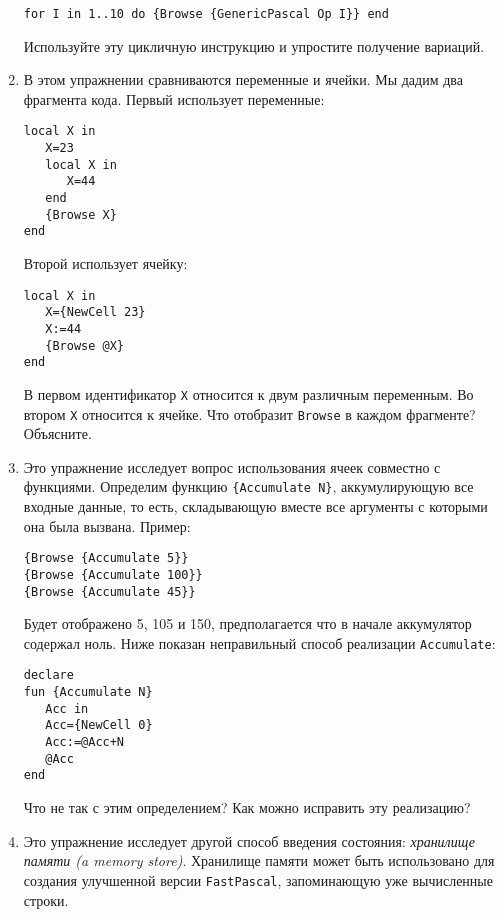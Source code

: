 \begin{enumerate}
{\begin{enumerate}
{\begin{lstlisting} 
for I in 1..10 do {Browse {GenericPascal Op I}} end
 \end{lstlisting}

Используйте эту цикличную инструкцию и упростите получение вариаций.}
\end{enumerate}


}

\item{
В этом упражнении сравниваются переменные и ячейки. Мы дадим два фрагмента кода. Первый использует переменные:

\begin{lstlisting}
local X in
   X=23
   local X in
      X=44
   end
   {Browse X}
end
\end{lstlisting}

Второй использует ячейку:

\begin{lstlisting}
local X in
   X={NewCell 23}
   X:=44
   {Browse @X}
end
\end{lstlisting}

В первом идентификатор \lstinline|X| относится к двум различным переменным. Во втором \lstinline|X| относится к ячейке. Что отобразит \lstinline|Browse| в каждом фрагменте? Объясните.
}

\item{Это упражнение исследует вопрос использования ячеек совместно с функциями. Определим функцию \lstinline|{Accumulate N}|, аккумулирующую все входные данные, то есть, складывающую вместе все аргументы с которыми она была вызвана. Пример:

  \begin{lstlisting}
{Browse {Accumulate 5}}
{Browse {Accumulate 100}}
{Browse {Accumulate 45}}
  \end{lstlisting}
  
Будет отображено 5, 105 и 150, предполагается что в начале аккумулятор содержал ноль. Ниже показан неправильный способ реализации \lstinline|Accumulate|:

\begin{lstlisting}
declare
fun {Accumulate N}
   Acc in
   Acc={NewCell 0}
   Acc:=@Acc+N
   @Acc
end
\end{lstlisting}

Что не так с этим определением? Как можно исправить эту реализацию?}

\item{Это упражнение исследует другой способ введения состояния: \emph{хранилище памяти (a memory store)}. Хранилище памяти может быть использовано для создания улучшенной версии \lstinline|FastPascal|, запоминающую уже вычисленные строки.

}
\end{enumerate}
